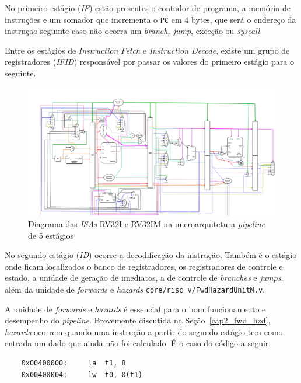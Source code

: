         { No primeiro estágio (\textit{IF}) estão presentes o contador de programa,
            a memória de instruções e um somador que incrementa o \texttt{PC} em 4
            bytes, que será o endereço da instrução seguinte caso não ocorra um
            \textit{branch, jump}, exceção ou \textit{syscall}.
        }

        { Entre os estágios de \textit{Instruction Fetch} e \textit{Instruction
            Decode}, existe um grupo de registradores (\textit{IFID}) responsável
            por passar os valores do primeiro estágio para o seguinte.
        }

        \begin{figure}[H]
        \centering
            \includegraphics[width=.9\linewidth]{../images/uarch_diagrams/pipeline-RV32I-RV32IM.png}
            \caption{Diagrama das \textit{ISAs} RV32I e RV32IM na microarquitetura
                \textit{pipeline} de 5 estágios}\label{fig:diagram_rv32i_pipe}
        \end{figure}

        { No segundo estágio (\textit{ID}) ocorre a decodificação da instrução.
            Também é o estágio onde ficam localizados o banco de registradores,
            os registradores de controle e estado, a unidade de geração de imediatos,
            a de controle de \textit{branches} e \textit{jumps}, além da unidade
            de \textit{forwards} e \textit{hazards} \texttt{core/risc\_v/FwdHazardUnitM.v}.
        }

        { A unidade de \textit{forwards} e \textit{hazards} é essencial para o
            bom funcionamento e desempenho do \textit{pipeline}. Brevemente discutida
            na Seção~\ref{cap2_fwd_hzd}, \textit{hazards} ocorrem quando uma instrução
            a partir do segundo estágio tem como entrada um dado que ainda não foi
            calculado. É o caso do código a seguir:
        }
        \begin{lstlisting}
    0x00400000:     la  t1, 8
    0x00400004:     lw  t0, 0(t1)
        \end{lstlisting}

